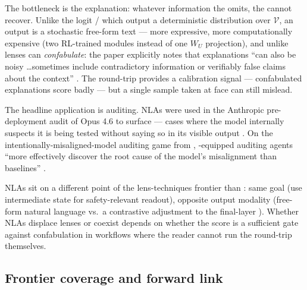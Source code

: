 The bottleneck is the explanation: whatever information the  omits,
the  cannot recover. Unlike the logit /  which output a
deterministic distribution over $\mathcal{V}$, an  output is a
stochastic free-form text — more expressive, more computationally
expensive (two RL-trained  modules instead of one $W_U$
projection), and unlike lenses can \emph{confabulate}: the paper
explicitly notes that  explanations
``can also be noisy \ldots sometimes include contradictory information
or verifiably false claims about the context''
\citep[\S confabulation;
kb/excerpts/anthropic2026-nla\#sec-confabulation]{anthropic2026-nla}.
The round-trip  provides a calibration signal — confabulated
explanations score badly — but a single sample taken at face 
can still mislead.

The headline application is auditing. NLAs were used in
the Anthropic pre-deployment audit of  Opus 4.6 to surface
 — cases where the model internally suspects it is being
tested without saying so in its visible output
\citep[\S auditing; kb/excerpts/anthropic2026-nla\#sec-auditing]{anthropic2026-nla}.
On the intentionally-misaligned-model auditing game from
\citet{marks-tegmark-2023-truth}, -equipped auditing agents
``more effectively discover the root cause of the model's
misalignment than baselines''
\citep[\S auditing]{anthropic2026-nla} .

NLAs sit on a different point of the lens-techniques frontier than
: same goal (use intermediate state for safety-relevant readout),
opposite output modality (free-form natural language vs.\ a contrastive
adjustment to the final-layer ). Whether NLAs displace lenses
or coexist depends on whether the  score is a sufficient gate
against confabulation in workflows where the reader cannot run the
round-trip themselves.

\subsection{Frontier coverage and forward link}
\label{sec:lens-forward}

